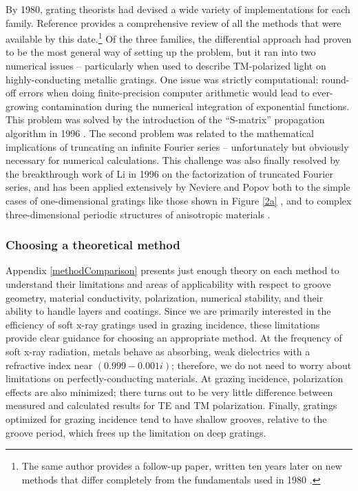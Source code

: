By 1980, grating theorists had devised a wide variety of implementations for each family.  %
Reference \cite{Pet80} provides a comprehensive review of all the methods that were available by this date.\footnote{The same author provides a follow-up paper, written ten years later on new methods that differ completely from the fundamentals used in 1980 \cite{Pet90}.}  Of the three families, the differential approach had proven to be the most general way of setting up the problem, but it ran into two numerical issues -- particularly when used to describe TM-polarized light on highly-conducting metallic gratings.  One issue was strictly computational: round-off errors when doing finite-precision computer arithmetic would lead to ever-growing contamination during the numerical integration of exponential functions.  This problem was solved by the introduction of the ``S-matrix'' propagation algorithm in 1996 \cite{Li96}\cite{Mon98}.  The second problem was related to the mathematical implications of truncating an infinite Fourier series -- unfortunately but obviously necessary for numerical calculations.  This challenge was also finally resolved by the breakthrough work of Li \cite{Li96b} in 1996 on the factorization of truncated Fourier series, and has been applied extensively by Neviere and Popov both to the simple cases of one-dimensional gratings like those shown in Figure \ref{2a} \cite{Pop01}, and to complex three-dimensional periodic structures of anisotropic materials \cite{Pop00}\cite{Nev02}.

\subsubsection{Choosing a theoretical method}
Appendix \ref{methodComparison} presents just enough theory on each method to understand their limitations and areas of applicability with respect to groove geometry, material conductivity, polarization, numerical stability, and their ability to handle layers and coatings.  Since we are primarily interested in the efficiency of soft x-ray gratings used in grazing incidence, these limitations provide clear guidance for choosing an appropriate method.  At the frequency of soft x-ray radiation, metals behave as absorbing, weak dielectrics with a refractive index near $(0.999 - 0.001i)$; therefore, we do not need to worry about limitations on perfectly-conducting materials.  At grazing incidence, polarization effects are also minimized; there turns out to be very little difference between measured and calculated results for TE and TM polarization.  Finally, gratings optimized for grazing incidence tend to have shallow grooves, relative to the groove period, which frees up the limitation on deep gratings.

